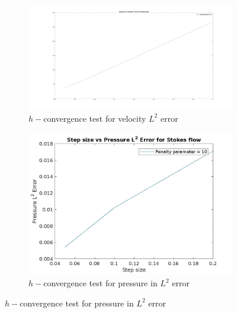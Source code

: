 \documentclass[a4paper,twoside,openright]{book}
\begin{document}
\begin{figure}
\begin{subfigure}{\textwidth}	
  \includegraphics[width=\linewidth]{l2_velocity_stokes.jpg}
  \caption{$h-$convergence test for velocity $L^2$ error}
  \label{fig:vel_stoke_conv}
\end{subfigure}
\begin{subfigure}{\textwidth}	
  \includegraphics[width=\linewidth]{l2_pressure_stokes.jpg}
  \caption{$h-$convergence test for pressure in $L^2$ error}
  \label{fig:pre_stoke_conv}
\end{subfigure}
\end{figure}
\end{document}
